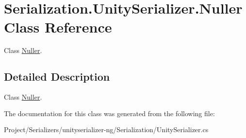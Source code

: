 \hypertarget{class_serialization_1_1_unity_serializer_1_1_nuller}{}\section{Serialization.\+Unity\+Serializer.\+Nuller Class Reference}
\label{class_serialization_1_1_unity_serializer_1_1_nuller}


Class \hyperlink{class_serialization_1_1_unity_serializer_1_1_nuller}{Nuller}.  




\subsection{Detailed Description}
Class \hyperlink{class_serialization_1_1_unity_serializer_1_1_nuller}{Nuller}. 



The documentation for this class was generated from the following file\+:\begin{DoxyCompactItemize}
\item 
Project/\+Serializers/unityserializer-\/ng/\+Serialization/Unity\+Serializer.\+cs\end{DoxyCompactItemize}
